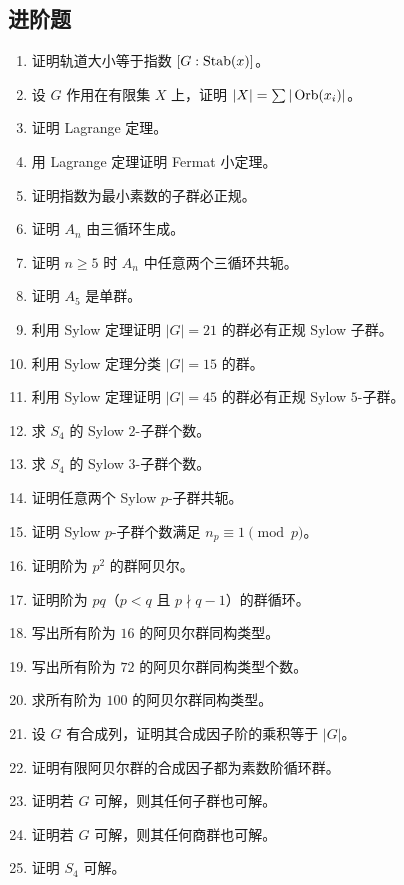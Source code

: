 \subsection*{进阶题}
\begin{enumerate}[resume, label=\textbf{\arabic*.}, leftmargin=*, itemsep=0.5em]
\item \medium 证明轨道大小等于指数 $[G:\operatorname{Stab}(x)]$。
\item \medium 设 $G$ 作用在有限集 $X$ 上，证明 $|X|=\sum |\operatorname{Orb}(x_i)|$。
\item \medium 证明 Lagrange 定理。
\item \medium 用 Lagrange 定理证明 Fermat 小定理。
\item \medium 证明指数为最小素数的子群必正规。
\item \medium 证明 $A_n$ 由三循环生成。
\item \medium 证明 $n\ge5$ 时 $A_n$ 中任意两个三循环共轭。
\item \medium 证明 $A_5$ 是单群。
\item \medium 利用 Sylow 定理证明 $|G|=21$ 的群必有正规 Sylow 子群。
\item \medium 利用 Sylow 定理分类 $|G|=15$ 的群。
\item \medium 利用 Sylow 定理证明 $|G|=45$ 的群必有正规 Sylow $5$-子群。
\item \medium 求 $S_4$ 的 Sylow $2$-子群个数。
\item \medium 求 $S_4$ 的 Sylow $3$-子群个数。
\item \medium 证明任意两个 Sylow $p$-子群共轭。
\item \medium 证明 Sylow $p$-子群个数满足 $n_p\equiv1\pmod p$。
\item \medium 证明阶为 $p^2$ 的群阿贝尔。
\item \medium 证明阶为 $pq$（$p<q$ 且 $p\nmid q-1$）的群循环。
\item \medium 写出所有阶为 $16$ 的阿贝尔群同构类型。
\item \medium 写出所有阶为 $72$ 的阿贝尔群同构类型个数。
\item \medium 求所有阶为 $100$ 的阿贝尔群同构类型。
\item \medium 设 $G$ 有合成列，证明其合成因子阶的乘积等于 $|G|$。
\item \medium 证明有限阿贝尔群的合成因子都为素数阶循环群。
\item \medium 证明若 $G$ 可解，则其任何子群也可解。
\item \medium 证明若 $G$ 可解，则其任何商群也可解。
\item \medium 证明 $S_4$ 可解。
\end{enumerate}
